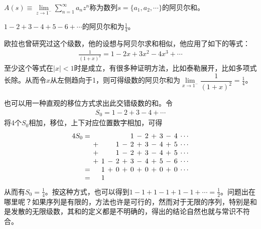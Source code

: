 \begin{definition}[阿贝尔和]
  $A(s)\equiv\lim\limits_{z\to1^{-}}\sum\limits_{n=1}^\infty a_nz^n$称为数列$s=\{a_1,a_2,\cdots\}$的阿贝尔和。
\end{definition}
\begin{example}
  $1-2+3-4+5-6+\cdots$的阿贝尔和为$\frac14$。

  欧拉也曾研究过这个级数，他的设想与阿贝尔求和相似，他应用了如下的等式：
  \begin{align*}
    \frac1{(1+x)^2} = 1 - 2x + 3x^2 - 4x^3 + \cdots 
  \end{align*}
  至少这个等式在$|x|<1$时是成立，有很多种证明方法，比如泰勒展开，比如多项式长除。从而令$x$从左侧趋向于1，则可得级数的阿贝尔和为$\lim\limits_{x\to1^-}\dfrac{1}{(1+x)^2}=\frac14$。

      也可以用一种直观的移位方式求出此交错级数的和。令
      \begin{align*}
        S_0 = 1 - 2 + 3 - 4 + \cdots
      \end{align*}
      将4个$S_0$相加，移位，上下对应位置数字相加，可得
      \begin{align*}\setlength\arraycolsep{2pt}
        \begin{array}{rccccccccccccc}
          4S_0 = &   &  &  &  &  &1 & -&2 & +&3 & -&4 & \cdots\\
                 & + &  &  &1  & -&2 & +&3 & -&4 & +&5 & \cdots\\
                 & + &  &  &1  & -&2 & +&3 & -&4 & +&5 & \cdots\\
                 & + &1 & -&2 & +&3 & -&4 & +&5 & -&6 & \cdots\\
               = &   &1 & +&0 & +&0 & +&0 & +&0 & +&0 & \cdots\\
               = &   &1
        \end{array}
      \end{align*}
      从而有$S_0=\frac14$。按这种方式，也可以得到$1-1+1-1+1-1+\cdots=\frac12$。问题出在哪里呢？如果序列是有限的，方法也许是可行的，然而对于无限的序列，特别是和是发散的无限级数，其和的定义都是不明确的，得出的结论自然也就与常识不符合。
\end{example}


